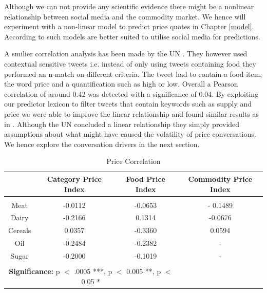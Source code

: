  Although we can not provide any scientific evidence there might be a nonlinear relationship between social media and the commodity market. We hence will experiment with a non-linear model to predict price quotes in Chapter \ref{model}. According to \cite{de08} such models are better suited to utilise social media for predictions. 

A smilier correlation analysis has been made by the UN \cite{ungp2013}. They however used contextual sensitive tweets i.e. instead of only using tweets containing food they performed an n-match on different criteria. The tweet had to contain a food item, the word price and a quantification such as high or low. Overall a Pearson correlation of around 0.42 was detected with a significance of 0.04. By exploiting our predictor lexicon to filter tweets that contain keywords such as supply and price we were able to improve the linear relationship and found similar results as in \cite{ungp2013}. Although the UN concluded a linear relationship they simply provided assumptions about what might have caused the volatility of price conversations. We hence explore the conversation drivers in the next section. 
 

 
\begin{table}[h]   
 \begin{tabular}{  c  | c  | c | c }
			
   & \textbf{Category Price Index}  & \textbf{Food Price Index} & \textbf{Commodity Price Index} \\
  \hline 
  &&& \\
  Meat & -0.0112   & -0.0653 & - 0.1489  \\
  
  Dairy & -0.2166   & 0.1314 & -0.0676\\

  Cereals & 0.0357  & -0.3360 & 0.0594 \\

  Oil & -0.2484  &  -0.2382 & -   \\

  Sugar & -0.2000 & -0.1019 &  - \\

\hline 

\multicolumn{3}{c}{\null}\\

\multicolumn{3}{c}{\textbf{Significance:} p $<$ .0005 ***, p $<$ 0.005 **, p $<$ 0.05 *}\\
\hline  

\end{tabular}
\caption{Price Correlation}
\label{tab:abc}


\end{table}


